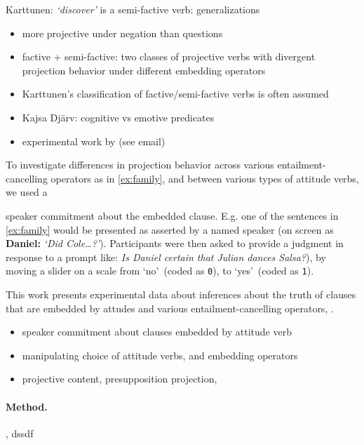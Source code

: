 \documentclass[12pt, a4paper]{scrartcl}
\begin{document}
Karttunen: \emph{\lq discover\rq} is a semi-factive verb: generalizations 
\begin{itemize}
	\item more projective under negation than questions
	\item factive + semi-factive: two classes of projective verbs with divergent projection behavior under different embedding operators
	\item Karttunen's classification of factive/semi-factive verbs is often assumed
	\item Kajsa Djärv: cognitive vs emotive predicates
	\item experimental work by (see email)
\end{itemize}

\noindent To investigate differences in projection behavior across various entailment-cancelling operators as in \ref{ex:family}, and between various types of attitude verbs, we used a 

speaker commitment about the embedded clause. E.g. one of the sentences in \ref{ex:family} would be presented as asserted by a named speaker (on screen as \textbf{Daniel:} \emph{\lq Did Cole\dots?\rq}). Participants were then asked to provide a judgment in response to a prompt like: \emph{Is Daniel certain that Julian dances Salsa?}), by moving a slider on a scale from \lq no\rq\ (coded as \texttt{0}), to \lq yes\rq\ (coded as \texttt{1}). 

This work presents experimental data about inferences about the truth of clauses that are embedded by attudes and various entailment-cancelling operators, .
\begin{itemize}
	\item speaker commitment about clauses embedded by attitude verb
	\item manipulating choice of attitude verbs, and embedding operators
\end{itemize}

\begin{itemize}
	\item projective content, presupposition projection, 
\end{itemize}


\vspace{-1.2\baselineskip}
\paragraph{Method.} \hspace{-0.95em}, 
	dssdf



\pagebreak

\end{document}
